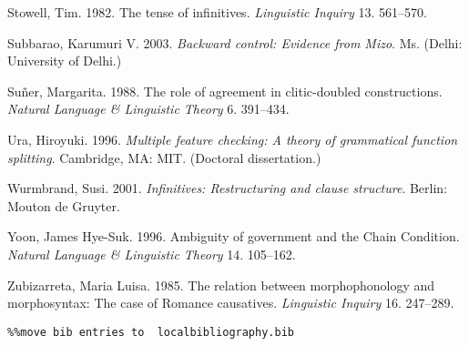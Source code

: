 \documentclass[output=paper]{langsci/langscibook}
\begin{document}
Stowell, Tim. 1982. The tense of infinitives. \textit{Linguistic Inquiry} 13. 561–570. 

Subbarao, Karumuri V. 2003. \textit{Backward control: Evidence from Mizo}. Ms. (Delhi: University of Delhi.)

Suñer, Margarita. 1988. The role of agreement in clitic-doubled constructions. \textit{Natural Language \& Linguistic Theory} 6. 391–434.

Ura, Hiroyuki. 1996. \textit{Multiple feature checking: A theory of grammatical function splitting}. Cambridge, MA: MIT. (Doctoral dissertation.)

Wurmbrand, Susi. 2001. \textit{Infinitives: Restructuring and clause structure}. Berlin: Mouton de Gruyter.

Yoon, James Hye-Suk. 1996. Ambiguity of government and the Chain Condition. \textit{Natural Language \& Linguistic Theory} 14. 105–162. 

\begin{styleHeader}
Zubizarreta, Maria Luisa. 1985. The relation between morphophonology and morphosyntax: The case of Romance causatives. \textit{Linguistic Inquiry} 16. 247–289.
\end{styleHeader}


\begin{verbatim}%%move bib entries to  localbibliography.bib
\end{verbatim} 

\sloppy
\printbibliography[heading=subbibliography,notkeyword=this] 
\end{document}
